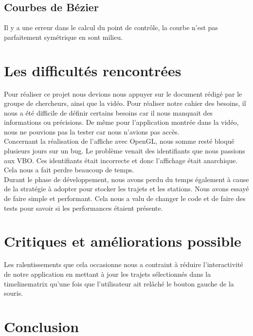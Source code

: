\documentclass[12pt]{article}
\begin{document}
		\subsection{Courbes de Bézier}
		Il y a une erreur dans le calcul du point de contrôle, la courbe n'est pas parfaitement
		symétrique en sont milieu.
		
	\newpage
	\section{Les difficultés rencontrées}
	Pour réaliser ce projet nous devions nous appuyer sur le document rédigé par le groupe de
	chercheurs, ainsi que la vidéo. Pour réaliser notre cahier des besoins, il nous a été
	difficile de définir certains besoins car il nous manquait des informations ou précisions.
	De même pour l’application montrée dans la vidéo, nous ne pouvions pas la tester car nous
	n'avions pas accès.\\

	Concernant la réalisation de l’affiche avec OpenGL, nous somme resté bloqué plusieurs jours
	sur un bug. Le problème venait des identifiants que nous passions aux VBO. Ces identifiants
	était incorrecte et donc l'affichage était anarchique.
	Cela nous a fait perdre beaucoup de temps.\\

	Durant le phase de développement, nous avons perdu du temps également à cause de la
	stratégie à adopter pour stocker les trajets et les stations. Nous avons essayé de faire
	simple et performant. Cela nous a valu de changer le code et de faire des tests pour savoir
	si les performances étaient présente.
	
	\newpage
	\section{Critiques et améliorations possible} \label{ameliorations}
	Les ralentissements que cela occasionne nous a contraint à réduire l’interactivité de
	notre application en mettant à jour les trajets sélectionnés dans la timelinematrix qu’une
	fois que l’utilisateur ait relâché le bouton gauche de la souris.
	
	\newpage
	\section{Conclusion}

	\newpage
\end{document}
